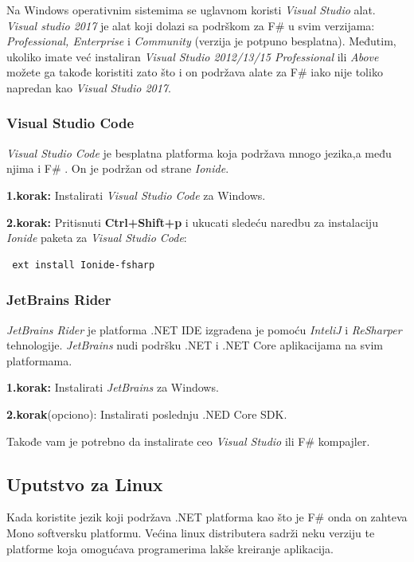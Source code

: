 \documentclass[a4paper]{article}
\begin{document}
Na Windows operativnim sistemima se uglavnom koristi {\em Visual Studio} alat. {\em Visual studio 2017} je alat koji dolazi sa podrškom za F\# u svim verzijama: {\em Professional, Enterprise} i {\em Community} (verzija je potpuno besplatna). Međutim, ukoliko imate  već instaliran {\em Visual Studio 2012/13/15  Professional} ili {\em Above} možete ga takođe koristiti zato što i on podržava alate za F\# iako nije toliko napredan kao {\em Visual Studio 2017}.

\subsubsection{Visual Studio Code}
	
{\em Visual Studio Code} je besplatna platforma koja podržava mnogo jezika,a među njima i F\# . On je podržan od strane {\em Ionide}\cite{ionide}.

\textbf{1.korak:} Instalirati {\em Visual Studio Code} za Windows.

\textbf{2.korak:} Pritisnuti \textbf{Ctrl+Shift+p} i ukucati sledeću naredbu za instalaciju {\em Ionide} paketa za {\em Visual Studio Code}:
\\
\begin{lstlisting}
 ext install Ionide-fsharp
\end{lstlisting}
 
\subsubsection{JetBrains Rider}

{\em JetBrains Rider} je platforma .NET IDE izgrađena je pomoću {\em InteliJ} i {\em ReSharper} tehnologije. {\em JetBrains} nudi podršku .NET i .NET Core aplikacijama na svim platformama.

\textbf{1.korak:} Instalirati {\em JetBrains} za Windows.

\textbf{2.korak}(opciono): Instalirati poslednju .NED Core SDK.

Takođe vam je potrebno da instalirate ceo {\em Visual Studio} ili F\# kompajler.


\subsection{Uputstvo za Linux}

Kada koristite jezik koji podržava .NET platforma kao što je F\# onda on zahteva Mono\cite{mono} softversku platformu. Većina linux distributera sadrži neku verziju te platforme koja omogućava programerima lakše kreiranje aplikacija. 
\end{document}
